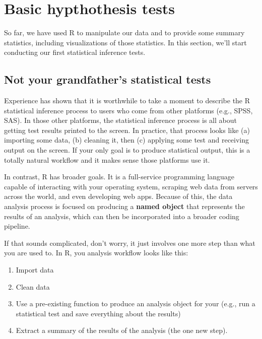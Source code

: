\documentclass[
]{book}
\providecommand{\tightlist}{%
  \setlength{\itemsep}{0pt}\setlength{\parskip}{0pt}}
\begin{document}
\hypertarget{basic-hypthothesis-tests}{%
\chapter{Basic hypthothesis tests}\label{basic-hypthothesis-tests}}

So far, we have used R to manipulate our data and to provide some summary statistics, including visualizations of those statistics. In this section, we'll start conducting our first statistical inference tests.

\hypertarget{not-your-grandfathers-statistical-tests}{%
\section{Not your grandfather's statistical tests}\label{not-your-grandfathers-statistical-tests}}

Experience has shown that it is worthwhile to take a moment to describe the R statistical inference process to users who come from other platforms (e.g., SPSS, SAS). In those other platforms, the statistical inference process is all about getting test results printed to the screen. In practice, that process looks like (a) importing some data, (b) cleaning it, then (c) applying some test and receiving output on the screen. If your only goal is to produce statistical output, this is a totally natural workflow and it makes sense those platforms use it.

In contrast, R has broader goals. It is a full-service programming language capable of interacting with your operating system, scraping web data from servers across the world, and even developing web apps. Because of this, the data analysis process is focused on producing a \textbf{named object} that represents the results of an analysis, which can then be incorporated into a broader coding pipeline.

If that sounds complicated, don't worry, it just involves one more step than what you are used to. In R, you analysis workflow looks like this:

\begin{enumerate}
\def\labelenumi{\arabic{enumi}.}
\tightlist
\item
  Import data
\item
  Clean data
\item
  Use a pre-existing function to produce an analysis object for your (e.g., run a statistical test and save everything about the results)
\item
  Extract a summary of the results of the analysis (the one new step).
\end{enumerate}
\end{document}

